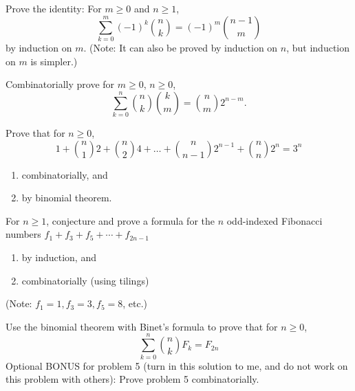 \documentclass[12pt,letterpaper]{hmcpset}
\renewcommand{\b}[2]{\binom{#1}{#2}}
\begin{document}

\begin{problem}[1]
    Prove the identity: For $m\geq0$ and $n\geq1$,
    \[
        \sum_{k=0}^{m}(-1)^k\b{n}{k}=(-1)^m\b{n-1}{m}
    \]
    by induction on $m$. (Note: It can also be proved by induction on $n$, but induction on $m$ is simpler.)
\end{problem}
\begin{solution}
    \vfill
\end{solution}
\newpage

\begin{problem}[2]
    Combinatorially prove for $m\geq0$, $n\geq0$,
    \[
        \sum_{k=0}^n\b{n}{k}\b{k}{m}=\b{n}{m}2^{n-m}.
    \]
\end{problem}
\begin{solution}
    \vfill
\end{solution}
\newpage

\begin{problem}[3]
    Prove that for $n\geq0$,
    \[
        1+\b{n}{1}2+\b{n}{2}4+\dots+\b{n}{n-1}2^{n-1}+\b{n}{n}2^n=3^n
    \]
    \begin{enumerate}
        \item combinatorially, and
        \item by binomial theorem.
    \end{enumerate}
\end{problem}
\begin{solution}
    \vfill
\end{solution}
\newpage

\begin{problem}[4]
    For $n\geq1$, conjecture and prove a formula for the $n$ odd-indexed Fibonacci numbers $f_1+f_3+f_5+\cdots+f_{2n-1}$
    \begin{enumerate}
        \item by induction, and
        \item combinatorially (using tilings)
    \end{enumerate}
    (Note: $f_1=1,f_3=3,f_5=8$, etc.)
\end{problem}
\begin{solution}
    \vfill
\end{solution}
\newpage

\begin{problem}[5]
    Use the binomial theorem with Binet's formula to prove that for $n\geq0$,
    \[
        \sum_{k=0}^n\b{n}{k}F_k=F_{2n}
    \]
    Optional BONUS for problem 5 (turn in this solution to me, and do not work on this problem with others): Prove problem 5 combinatorially.
\end{problem}
\begin{solution}
    \vfill
\end{solution}
\newpage
\end{document}
